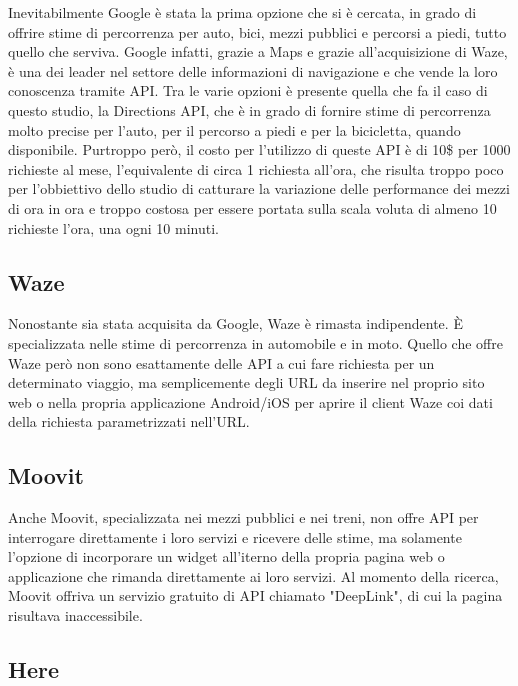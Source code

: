 Inevitabilmente Google è stata la prima opzione che si è cercata, in grado di offrire stime di percorrenza per auto, bici, mezzi pubblici e percorsi a piedi, tutto quello che serviva. Google infatti, grazie a Maps e grazie all'acquisizione di Waze, è una dei leader nel settore delle informazioni di navigazione e che vende la loro conoscenza tramite API\cite{googleblog}. Tra le varie opzioni è presente quella che fa il caso di questo studio, la Directions API, che è in grado di fornire stime di percorrenza molto precise per l'auto, per il percorso a piedi e per la bicicletta, quando disponibile\cite{googleapi}. Purtroppo però, il costo per l'utilizzo di queste API è di 10\$ per 1000 richieste al mese, l'equivalente di circa 1 richiesta all'ora, che risulta troppo poco per l'obbiettivo dello studio di catturare la variazione delle performance dei mezzi di ora in ora e troppo costosa per essere portata sulla scala voluta di almeno 10 richieste l'ora, una ogni 10 minuti\cite{googleapiprice}.

\subsection{Waze}

Nonostante sia stata acquisita da Google, Waze è rimasta indipendente. È specializzata nelle stime di percorrenza in automobile e in moto. Quello che offre Waze però non sono esattamente delle API a cui fare richiesta per un determinato viaggio, ma semplicemente degli URL da inserire nel proprio sito web o nella propria applicazione Android/iOS per aprire il client Waze coi dati della richiesta parametrizzati nell'URL\cite{wazeapi}.

\subsection{Moovit}

Anche Moovit, specializzata nei mezzi pubblici e nei treni, non offre API per interrogare direttamente i loro servizi e ricevere delle stime, ma solamente l'opzione di incorporare un widget all'iterno della propria pagina web o applicazione che rimanda direttamente ai loro servizi\cite{moovitapi}. Al momento della ricerca, Moovit offriva un servizio gratuito di API chiamato "DeepLink", di cui la pagina risultava inaccessibile.

\subsection{Here}


